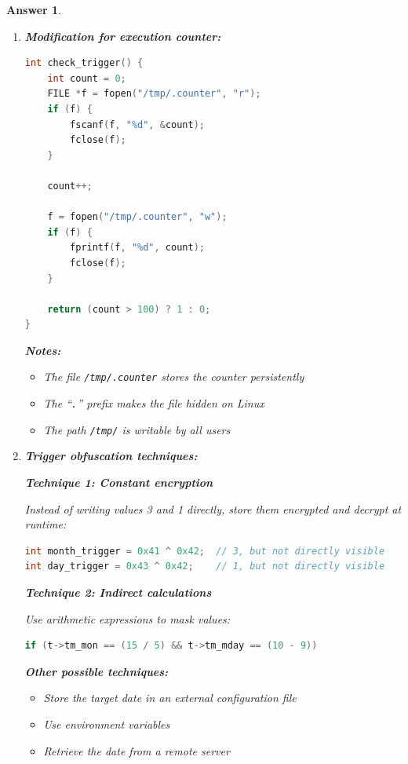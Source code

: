\documentclass[a4paper,11pt]{article}
\theoremstyle{plain}
\newtheorem{correction}{Answer}
\theoremstyle{definition}
\begin{document}
\begin{correction}
\begin{enumerate}
\item \textbf{Modification for execution counter:}

\begin{lstlisting}[language=C]
int check_trigger() {
    int count = 0;
    FILE *f = fopen("/tmp/.counter", "r");
    if (f) {
        fscanf(f, "%d", &count);
        fclose(f);
    }

    count++;

    f = fopen("/tmp/.counter", "w");
    if (f) {
        fprintf(f, "%d", count);
        fclose(f);
    }

    return (count > 100) ? 1 : 0;
}
\end{lstlisting}

\textbf{Notes:}
\begin{itemize}
\item The file \texttt{/tmp/.counter} stores the counter persistently
\item The ``\texttt{.}'' prefix makes the file hidden on Linux
\item The path \texttt{/tmp/} is writable by all users
\end{itemize}

\item \textbf{Trigger obfuscation techniques:}

\textbf{Technique 1: Constant encryption}

Instead of writing values 3 and 1 directly, store them encrypted and decrypt at runtime:
\begin{lstlisting}[language=C]
int month_trigger = 0x41 ^ 0x42;  // 3, but not directly visible
int day_trigger = 0x43 ^ 0x42;    // 1, but not directly visible
\end{lstlisting}

\textbf{Technique 2: Indirect calculations}

Use arithmetic expressions to mask values:
\begin{lstlisting}[language=C]
if (t->tm_mon == (15 / 5) && t->tm_mday == (10 - 9))
\end{lstlisting}

\textbf{Other possible techniques:}
\begin{itemize}
\item Store the target date in an external configuration file
\item Use environment variables
\item Retrieve the date from a remote server
\end{itemize}


\end{enumerate}
\end{correction}
\end{document}
